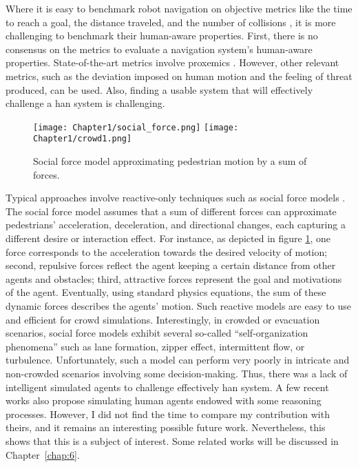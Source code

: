 Where it is easy to benchmark robot navigation on objective metrics like the time to reach a goal, the distance traveled, and the number of collisions \cite{perille2020benchmarking}, it is more challenging to benchmark their human-aware properties.
First, there is no consensus on the metrics to evaluate a navigation system's human-aware properties. State-of-the-art metrics involve proxemics \cite{samarakoon2022review}. However, other relevant metrics, such as the deviation imposed on human motion and the feeling of threat produced, can be used.
Also, finding a usable system that will effectively challenge a \acrfull{han} system is challenging. 

\begin{figure}
    \center
    \texttt{[image: Chapter1/social\_force.png]}
    \texttt{[image: Chapter1/crowd1.png]}
    \caption{Social force model approximating pedestrian motion by a sum of forces.}
    \label{fig:social_force_model}
\end{figure}

Typical approaches involve reactive-only techniques such as social force models \cite{helbing1995social,chen_social_2018}. 
The social force model assumes that a sum of different forces can approximate pedestrians' acceleration, deceleration, and directional changes, each capturing a different desire or interaction effect. For instance, as depicted in figure \ref{fig:social_force_model}, one force corresponds to the acceleration towards the desired velocity of motion; second, repulsive forces reflect the agent keeping a certain distance from other agents and obstacles; third, attractive forces represent the goal and motivations of the agent. Eventually, using standard physics equations, the sum of these dynamic forces describes the agents' motion.
Such reactive models are easy to use and efficient for crowd simulations. Interestingly, in crowded or evacuation scenarios, social force models exhibit several so-called ``self-organization phenomena'' such as lane formation, zipper effect, intermittent flow, or turbulence.
Unfortunately, such a model can perform very poorly in intricate and non-crowded scenarios involving some decision-making. Thus, there was a lack of intelligent simulated agents to challenge effectively \acrshort{han} system.
A few recent works also propose simulating human agents endowed with some reasoning processes. However, I did not find the time to compare my contribution with theirs, and it remains an interesting possible future work. Nevertheless, this shows that this is a subject of interest. Some related works will be discussed in Chapter~\ref{chap:6}.
